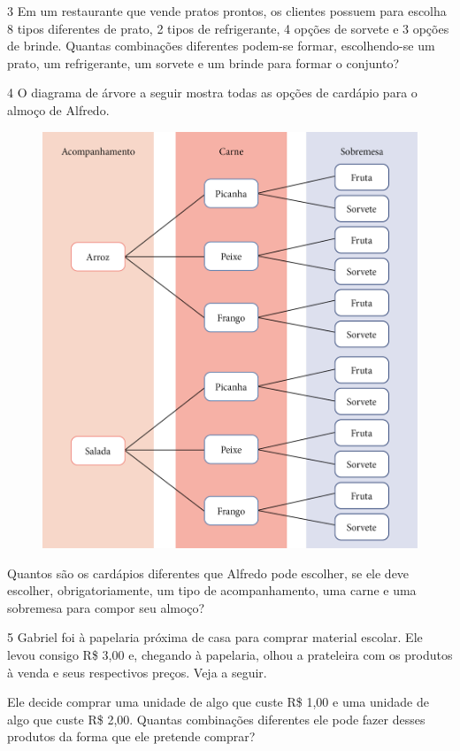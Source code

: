 \num{3} Em um restaurante que vende pratos prontos, os clientes possuem para
escolha 8 tipos diferentes de prato, 2 tipos de refrigerante, 4 opções
de sorvete e 3 opções de brinde. Quantas combinações diferentes podem-se
formar, escolhendo-se um prato, um refrigerante, um sorvete e um brinde para
formar o conjunto?

\pagebreak

\num{4} O diagrama de árvore a seguir mostra todas as opções de cardápio para o
almoço de Alfredo.

\begin{figure}[htpb!]
\centering
\includegraphics[width=.8\textwidth]{media/image73.png}
\end{figure}

Quantos são os cardápios diferentes que Alfredo pode escolher, se
ele deve escolher, obrigatoriamente, um tipo de acompanhamento, uma
carne e uma sobremesa para compor seu almoço?


\num{5} Gabriel foi à papelaria próxima de casa para comprar material
escolar. Ele levou consigo R\$ 3,00 e, chegando à papelaria, olhou a
prateleira com os produtos à venda e seus respectivos preços. Veja a seguir.

Ele decide comprar uma unidade de algo que custe R\$ 1,00 e uma unidade de
algo que custe R\$ 2,00. Quantas combinações diferentes ele pode fazer
desses produtos da forma que ele pretende comprar?

